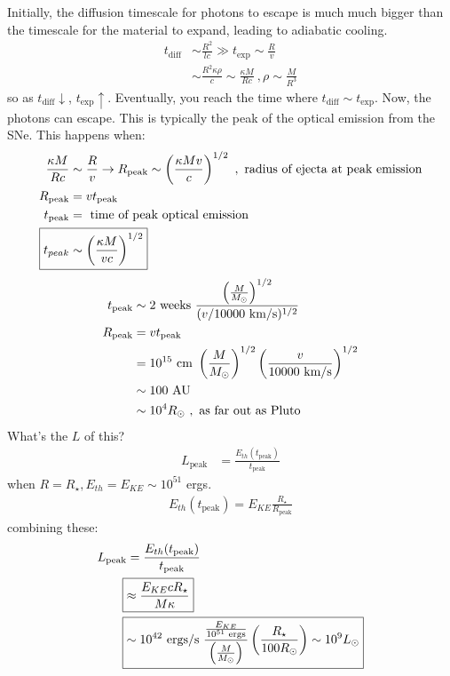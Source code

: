 Initially, the diffusion timescale for photons to escape is much much bigger than the timescale for the material to expand, leading to adiabatic cooling. 
\begin{align}
t_{\textrm{diff}} &\sim \frac{R^2}{lc} \gg t_{\textrm{exp}} \sim \frac{R}{v}\\
& \sim \frac{R^2 \kappa \rho}{c} \sim \frac{\kappa M}{Rc}~,\rho \sim \frac{M}{R^3}
\end{align}
so as $t_{\textrm{diff}} \downarrow$, $t_{\textrm{exp}} \uparrow$. Eventually, you reach the time where $t_{\textrm{diff}} \sim t_{\textrm{exp}}$. Now, the photons can escape. This is typically the peak of the optical emission from the SNe. This happens when:
\begin{align}
\frac{\kappa M}{Rc} &\sim \frac{R}{v} \ra R_{\textrm{peak}} \sim \lp \frac{\kappa M v}{c}\rp^{1/2}~,\textrm{ radius of ejecta at peak emission}\\
R_{\textrm{peak}} &= vt_{\textrm{peak}}\\
t_{\textrm{peak}} &= \textrm{ time of peak optical emission}\\
\Aboxed{t_{peak} &\sim \lp \frac{\kappa M}{vc} \rp^{1/2}}
\end{align}
\begin{align}
t_{\textrm{peak}} &\sim 2 \textrm{ weeks } \frac{\left( \frac{M}{M_\odot}\right)^{1/2}}{(v/10000\textrm{ km/s})^{1/2}}\\
R_{\textrm{peak}} &= vt_{\textrm{peak}}\\
&= 10^{15} \textrm{ cm } \left( \frac{M}{M_\odot}\right)^{1/2} \left( \frac{v}{10000\textrm{ km/s}} \right)^{1/2}\\
&\sim 100 \textrm{ AU}\\
&\sim 10^4 R_\odot~,\textrm{ as far out as Pluto}
\end{align}
What's the $L$ of this?
\begin{align}
L_{\textrm{peak}} &= \frac{E_{th}(t_{\textrm{peak}})}{t_{\textrm{peak}}}
\end{align}
when $R = R_\star, E_{th} = E_{KE} \sim 10^{51}$ ergs.
\begin{align}
E_{th}(t_{\textrm{peak}}) = E_{KE} \frac{R_\star}{R_{\textrm{peak}}}
\end{align}
combining these:
\begin{align}
L_{\textrm{peak}} &= \frac{E_{th}(t_{\textrm{peak}})}{t_{\textrm{peak}}}\\
\Aboxed{&\approx \frac{E_{KE}cR_\star}{M\kappa}}\\
\Aboxed{&\sim 10^{42} \textrm{ ergs/s } \frac{\frac{E_{KE}}{10^{51}\textrm{ ergs}}}{\mfrac} \lp \frac{R_\star}{100R_\odot} \rp \sim 10^9L_\odot}
\end{align}

